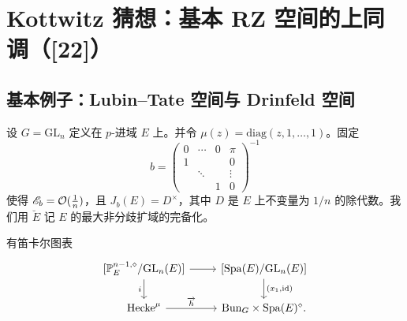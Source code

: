 
\section{Kottwitz 猜想：基本 RZ 空间的上同调（[22]）}

\subsection{基本例子：Lubin--Tate 空间与 Drinfeld 空间}

设 $G=\mathrm{GL}_n$ 定义在 $p$-进域 $E$ 上。并令 $\mu(z)=\mathrm{diag}(z,1,\dots,1)$。固定
\[
b=\begin{pmatrix}
0&\cdots&0&\pi\\
1&&&0\\
&\ddots&&\vdots\\
&&1&0
\end{pmatrix}^{-1}
\]
使得 $\mathscr{E}_b=\mathcal{O}(\frac1n)$，且 $J_b(E)=D^\times$，其中 $D$ 是 $E$ 上不变量为 $1/n$ 的除代数。我们用 $\breve{E}$ 记 $E$ 的最大非分歧扩域的完备化。

有笛卡尔图表
\begin{equation*}
\begin{tikzcd}
{[\PP^{n-1,\diamond}_E/\mathrm{GL}_n(E)]} \arrow[r] \arrow[d,"i"']
& {[\Spa(E)/\mathrm{GL}_n(E)]} \arrow[d,"{(x_1,\id)}"] \\
\mathrm{Hecke}^{\mu} \arrow[r,"\overrightarrow{h}"]
& \Bun_G\times\Spa(E)^{\diamond}.
\end{tikzcd}
\end{equation*}

